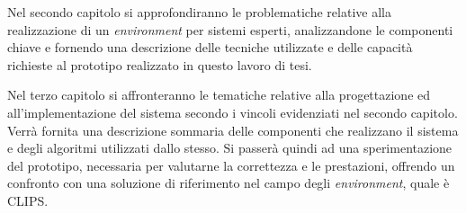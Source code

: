 Nel secondo capitolo si approfondiranno le problematiche relative alla realizzazione di un \emph{environment} per sistemi esperti, analizzandone le componenti chiave e fornendo una descrizione delle tecniche utilizzate e delle capacità richieste al prototipo realizzato in questo lavoro di tesi.

Nel terzo capitolo  si affronteranno le tematiche relative alla progettazione ed all'implementazione del sistema secondo i vincoli evidenziati nel secondo capitolo. Verrà fornita una descrizione sommaria delle componenti che realizzano il sistema e degli algoritmi utilizzati dallo stesso. Si passerà quindi ad una sperimentazione del prototipo, necessaria per valutarne la correttezza e le prestazioni, offrendo un confronto con una soluzione di riferimento nel campo degli \emph{environment}, quale è CLIPS.